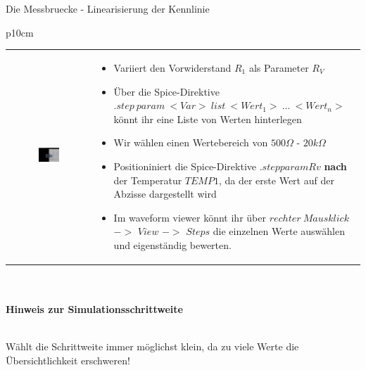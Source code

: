 \begin{frame}[t]{Die Messbruecke - Linearisierung der Kennlinie}
\begin{spacing}{0.9}
\begin{tiny}
\begin{table}[h!]
\begin{tabular}{p{10cm} }
\begin{tabular}{p{5cm} p{5cm}}
\begin{minipage}{0.5\textwidth}
           \begin{figure}
               \centering    
               \includegraphics[width=0.95\linewidth]{pictures/mb_kty81_steps.png}
           \end{figure}
       \end{minipage} 
       &
        \begin{minipage}{0.5\textwidth}
            \begin{itemize}
                \item Variiert den Vorwiderstand $R_1$ als Parameter $R_V$
                \item Über die Spice-Direktive $.step\ param\ <Var>\ list\ <Wert_1>\ ...\ <Wert_n>$ könnt ihr eine Liste von Werten hinterlegen
                \item Wir wählen einen Wertebereich von $500\Omega$ - $20k\Omega$
                \item Positioniniert die Spice-Direktive $.step param Rv$ \textbf{nach} der Temperatur $TEMP1$, da der erste Wert auf der Abzisse dargestellt wird
                \item Im waveform viewer könnt ihr über $rechter\ Mausklick$ $->$ $View$ $->$ $Steps$ die einzelnen Werte auswählen und eigenständig bewerten. 
            \end{itemize}
        \end{minipage}   
       \end{tabular}
       \\\\
       \hline
       \textbf{Hinweis zur Simulationsschrittweite} \\
       \hline \\
       \begin{minipage}{\textwidth}
        Wählt die Schrittweite immer möglichst klein, da zu viele Werte die Übersichtlichkeit erschweren!
        \end{minipage}
    \end{tabular}


\end{table}
\end{tiny}
\end{spacing}
\end{frame}
